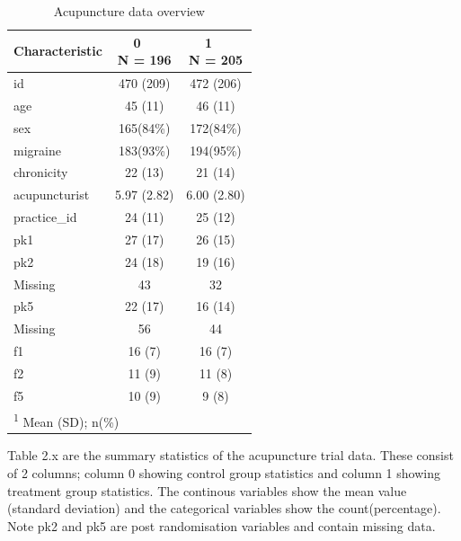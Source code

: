 \documentclass{article}
\begin{document}
\begin{table}

\caption{Acupuncture data overview}
\centering
\begin{tabular}[t]{l|c|c}
\hline
\textbf{Characteristic} & \makecell[c]{\textbf{0}\ \ \\N = 196} & \makecell[c]{\textbf{1}\ \ \\N = 205}\\
\hline
id & 470 (209) & 472 (206)\\
\hline
age & 45 (11) & 46 (11)\\
\hline
sex & 165(84\%) & 172(84\%)\\
\hline
migraine & 183(93\%) & 194(95\%)\\
\hline
chronicity & 22 (13) & 21 (14)\\
\hline
acupuncturist & 5.97 (2.82) & 6.00 (2.80)\\
\hline
practice\_id & 24 (11) & 25 (12)\\
\hline
pk1 & 27 (17) & 26 (15)\\
\hline
pk2 & 24 (18) & 19 (16)\\
\hline
\hspace{1em}Missing & 43 & 32\\
\hline
pk5 & 22 (17) & 16 (14)\\
\hline
\hspace{1em}Missing & 56 & 44\\
\hline
f1 & 16 (7) & 16 (7)\\
\hline
f2 & 11 (9) & 11 (8)\\
\hline
f5 & 10 (9) & 9 (8)\\
\hline
\multicolumn{3}{l}{\rule{0pt}{1em}\textsuperscript{1} Mean (SD); n(\%)}\\
\end{tabular}
\end{table}

Table 2.x are the summary statistics of the acupuncture trial data.
These consist of 2 columns; column 0 showing control group statistics
and column 1 showing treatment group statistics. The continous variables
show the mean value (standard deviation) and the categorical variables
show the count(percentage). Note pk2 and pk5 are post randomisation
variables and contain missing data.
\end{document}
